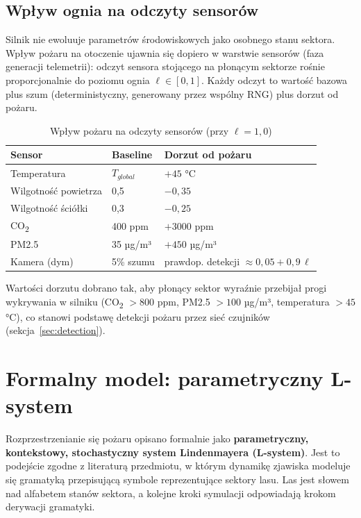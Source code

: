 \documentclass[11pt,a4paper]{article}
\begin{document}
\subsection{Wpływ ognia na odczyty sensorów}
\label{sec:sensors-fire}

Silnik nie ewoluuje parametrów środowiskowych jako osobnego stanu sektora. Wpływ pożaru na otoczenie ujawnia się dopiero w warstwie sensorów (faza generacji telemetrii): odczyt sensora stojącego na płonącym sektorze rośnie proporcjonalnie do poziomu ognia $\ell \in [0,1]$. Każdy odczyt to wartość bazowa plus szum (deterministyczny, generowany przez wspólny RNG) plus dorzut od pożaru.

\begin{table}[h!]
\centering
\caption{Wpływ pożaru na odczyty sensorów (przy $\ell = 1{,}0$)}
\begin{tabular}{|l|l|l|}
\hline
\textbf{Sensor} & \textbf{Baseline} & \textbf{Dorzut od pożaru} \\ \hline
Temperatura          & $T_{global}$ & $+45$ °C \\ \hline
Wilgotność powietrza & 0,5          & $-0{,}35$ \\ \hline
Wilgotność ściółki   & 0,3          & $-0{,}25$ \\ \hline
CO\textsubscript{2}  & 400 ppm      & $+3000$ ppm \\ \hline
PM2.5                & 35 µg/m³     & $+450$ µg/m³ \\ \hline
Kamera (dym)         & 5\% szumu    & prawdop. detekcji $\approx 0{,}05 + 0{,}9\,\ell$ \\ \hline
\end{tabular}
\end{table}

Wartości dorzutu dobrano tak, aby płonący sektor wyraźnie przebijał progi wykrywania w silniku (CO\textsubscript{2} $> 800$ ppm, PM2.5 $> 100$ µg/m³, temperatura $> 45$ °C), co stanowi podstawę detekcji pożaru przez sieć czujników (sekcja~\ref{sec:detection}).

\section{Formalny model: parametryczny L-system}
\label{sec:lsystem}

Rozprzestrzenianie się pożaru opisano formalnie jako \textbf{parametryczny, kontekstowy, stochastyczny system Lindenmayera (L-system)}. Jest to podejście zgodne z literaturą przedmiotu, w którym dynamikę zjawiska modeluje się gramatyką przepisującą symbole reprezentujące sektory lasu. Las jest słowem nad alfabetem stanów sektora, a kolejne kroki symulacji odpowiadają krokom derywacji gramatyki.
\end{document}
